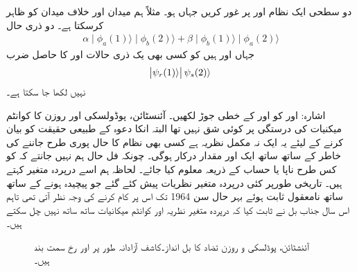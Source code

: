 دو سطحی ایک نظام  اور  پر غور کریں جہاں  ہو۔ مثلاً  ہم میدان اور  خلاف میدان کو ظاہر کرسکتا ہے۔ دو ذری حال 
\begin{align*}
	\alpha\mid\phi_a(1)\rangle\mid\phi_b(2)\rangle+\beta\mid\phi_b(1)\rangle\mid\phi_a(2)\rangle
\end{align*}
جہاں  اور  ہیں کو کسی بھی یک ذری حالات  اور  کا حاصل ضرب
\begin{align*}
	\abs{\psi_r(1)\rangle}\psi_s(2)\rangle
\end{align*}
نہیں لکھا جا سکتا ہے۔

اشارہ:  اور  کو  اور  کے خطی جوڑ لکھیں۔
آئنسٹائن، پوڈولسکی اور روزن کا کوانٹم میکنیات کی درستگی پر کوئی شق نہیں تھا البتہ انکا دعوہ کے طبیعی حقیقت کو بیان کرنے کے لیئے یہ ایک نہ مکمل نظریہ ہے کسی بھی نظام کا حال پوری طرح جاننے کی خاطر  کے ساتھ ساتھ ایک اور مقدار  درکار ہوگی۔ چونکہ فل حال ہم نہیں جانتے کہ  کو کس طرح ناپا یا حساب کے ذریعہ معلوم کیا جائے۔ لحاظہ ہم اسے درپردہ متغیر کہتے ہیں۔ تاریخی طورپر کئی درپردہ متغیر نظریات پیش کئے گئے جو پیچیدہ ہونے کے ساتھ ساتھ نامعقول ثابت ہوئے بہر حال سن \num{1964} تک اس پر کام کرنے کی وجہ نظر آتی تھی تاہم اس سال جناب بل نے ثابت کیا کہ درپردہ متغیر نظریہ اور کوانٹم میکانیات ساتھ ساتھ نہیں چل سکتے ہیں۔

\begin{figure}
\centering
{}
\caption{آئنشٹائن، پوڈلسکی و  روزن  تضاد کا بل  انداز۔کاشف آزادانہ طور پر  اور  رخ سمت بند ہیں۔}
\label{شکل_بکھراو_بل_انداز}
\end{figure}


